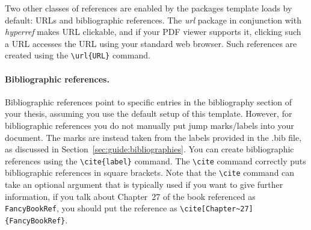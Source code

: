 Two other classes of references are enabled by the packages \ac{template} loads
by default: URLs and bibliographic references.
The \emph{url} package in conjunction with \emph{hyperref} makes URL clickable,
and if your PDF viewer supports it, clicking such a URL accesses the URL using
your standard web browser.
Such references are created using the \verb+\url{URL}+ command.

\paragraph{Bibliographic references.}
Bibliographic references point to specific entries in the bibliography section
of your thesis, assuming you use the default setup of this template.
However, for bibliographic references you do not manually put jump marks/labels
into your document.
The marks are instead taken from the labels provided in the \mbox{.bib} file,
as discussed in Section~\ref{sec:guide:bibliographies}.
You can create bibliographic references using the \verb+\cite{label}+ command.
The \verb+\cite+ command correctly puts bibliographic references in square
brackets. 
Note that the \verb+\cite+ command can take an optional argument that is
typically used if you want to give further information, \eg{} if you talk about
Chapter~27 of the book referenced as \verb+FancyBookRef+, you should put the
reference as \verb+\cite[Chapter~27]{FancyBookRef}+.
